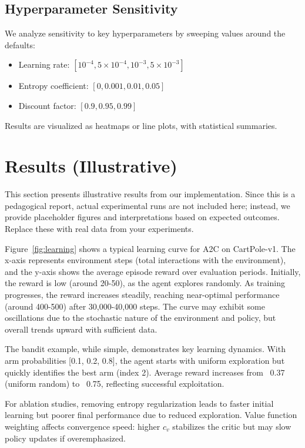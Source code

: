 \documentclass[11pt]{article}
\begin{document}
\subsection{Hyperparameter Sensitivity}
We analyze sensitivity to key hyperparameters by sweeping values around the defaults:

\begin{itemize}
  \item Learning rate: $[10^{-4}, 5 \times 10^{-4}, 10^{-3}, 5 \times 10^{-3}]$
  \item Entropy coefficient: $[0, 0.001, 0.01, 0.05]$
  \item Discount factor: $[0.9, 0.95, 0.99]$
\end{itemize}

Results are visualized as heatmaps or line plots, with statistical summaries.
\section{Results (Illustrative)}
This section presents illustrative results from our implementation. Since this is a pedagogical report, actual experimental runs are not included here; instead, we provide placeholder figures and interpretations based on expected outcomes. Replace these with real data from your experiments.

Figure~\ref{fig:learning} shows a typical learning curve for A2C on CartPole-v1. The x-axis represents environment steps (total interactions with the environment), and the y-axis shows the average episode reward over evaluation periods. Initially, the reward is low (around 20-50), as the agent explores randomly. As training progresses, the reward increases steadily, reaching near-optimal performance (around 400-500) after 30,000-40,000 steps. The curve may exhibit some oscillations due to the stochastic nature of the environment and policy, but overall trends upward with sufficient data.

The bandit example, while simple, demonstrates key learning dynamics. With arm probabilities [0.1, 0.2, 0.8], the agent starts with uniform exploration but quickly identifies the best arm (index 2). Average reward increases from ~0.37 (uniform random) to ~0.75, reflecting successful exploitation.

For ablation studies, removing entropy regularization leads to faster initial learning but poorer final performance due to reduced exploration. Value function weighting affects convergence speed: higher $c_v$ stabilizes the critic but may slow policy updates if overemphasized.
\end{document}
